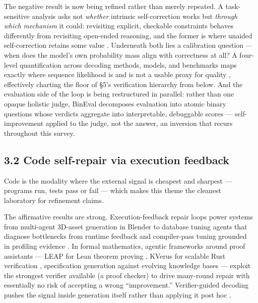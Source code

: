 \documentclass[
  11pt,
]{article}
\begin{document}
The negative result is now being refined rather than merely repeated. A
task-sensitive analysis asks not \emph{whether} intrinsic
self-correction works but \emph{through which mechanism} it could:
revisiting explicit, checkable constraints behaves differently from
revisiting open-ended reasoning, and the former is where unaided
self-correction retains some value \citep{stav2026when}. Underneath both
lies a calibration question --- when does the model's own probability
mass align with correctness at all? A four-level quantification across
decoding methods, models, and benchmarks maps exactly where sequence
likelihood is and is not a usable proxy for quality
\citep{zenn2026when}, effectively charting the floor of §5's
verification hierarchy from below. And the evaluation side of the loop
is being restructured in parallel: rather than one opaque holistic
judge, BinEval decomposes evaluation into atomic binary questions whose
verdicts aggregate into interpretable, debuggable scores
\citep{cho2026ask} --- self-improvement applied to the judge, not the
answer, an inversion that recurs throughout this survey.

\subsection{3.2 Code self-repair via execution
feedback}\label{code-self-repair-via-execution-feedback}

Code is the modality where the external signal is cheapest and sharpest
--- programs run, tests pass or fail --- which makes this theme the
cleanest laboratory for refinement claims.

The affirmative results are strong. Execution-feedback repair loops
power systems from multi-agent 3D-asset generation in Blender
\citep{lu2025ll3m} to database tuning agents that diagnose bottlenecks
from runtime feedback \citep{yang2026agenticdb} and compiler-pass tuning
grounded in profiling evidence \citep{li2026autopass}. In formal
mathematics, agentic frameworks around proof assistants --- LEAP for
Lean theorem proving \citep{kung2026leap}, KVerus for scalable Rust
verification \citep{liu2026kverus}, specification generation against
evolving knowledge bases \citep{wang2026kbspec} --- exploit the
strongest verifier available (a proof checker) to drive many-round
repair with essentially no risk of accepting a wrong ``improvement.''
Verifier-guided decoding pushes the signal inside generation itself
rather than applying it post hoc \citep{zhou2026verifier}.
\end{document}
